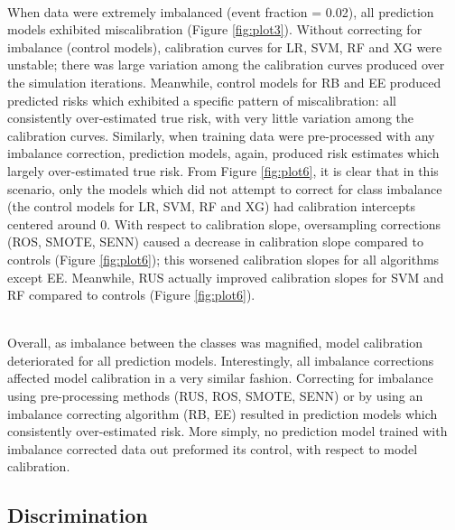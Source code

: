 \documentclass[AMA,STIX1COL,]{WileyNJD-v2}
\begin{document}
\strut \\
When data were extremely imbalanced (event fraction = 0.02), all
prediction models exhibited miscalibration (Figure \ref{fig:plot3}).
Without correcting for imbalance (control models), calibration curves
for LR, SVM, RF and XG were unstable; there was large variation among
the calibration curves produced over the simulation iterations.
Meanwhile, control models for RB and EE produced predicted risks which
exhibited a specific pattern of miscalibration: all consistently
over-estimated true risk, with very little variation among the
calibration curves. Similarly, when training data were pre-processed
with any imbalance correction, prediction models, again, produced risk
estimates which largely over-estimated true risk. From Figure
\ref{fig:plot6}, it is clear that in this scenario, only the models
which did not attempt to correct for class imbalance (the control models
for LR, SVM, RF and XG) had calibration intercepts centered around 0.
With respect to calibration slope, oversampling corrections (ROS, SMOTE,
SENN) caused a decrease in calibration slope compared to controls
(Figure \ref{fig:plot6}); this worsened calibration slopes for all
algorithms except EE. Meanwhile, RUS actually improved calibration
slopes for SVM and RF compared to controls (Figure \ref{fig:plot6}).\\
\strut \\
Overall, as imbalance between the classes was magnified, model
calibration deteriorated for all prediction models. Interestingly, all
imbalance corrections affected model calibration in a very similar
fashion. Correcting for imbalance using pre-processing methods (RUS,
ROS, SMOTE, SENN) or by using an imbalance correcting algorithm (RB, EE)
resulted in prediction models which consistently over-estimated risk.
More simply, no prediction model trained with imbalance corrected data
out preformed its control, with respect to model calibration.

\hypertarget{discrimination}{%
\subsection{Discrimination}\label{discrimination}}
\end{document}
